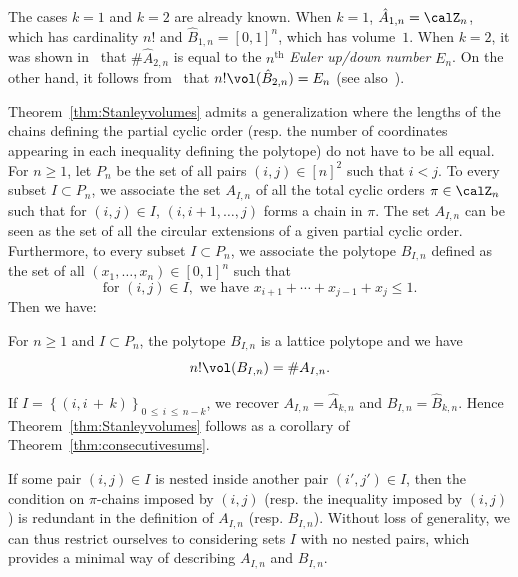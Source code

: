 \begin{rema}\label{rem:k23}
The cases $k=1$ and $k=2$ are already known. When $k=1$, $\hat{A}_{1,n}=\calZ_n$, which has cardinality $n!$ and $\hat{B}_{1,n}=[0,1]^n$, which has volume~$1$. When $k=2$, it was shown in~\cite{R17} that $\# \hat{A}_{2,n}$ is equal to the $n^\text{th}$ \emph{Euler up/down number} $E_n$. On the other hand, it follows from~\cite[Exercise~4.56$\MK$(c)]{S12} that $n! \vol(\hat{B}_{2,n}) = E_n$ (see also~\cite{SMN79}).
\end{rema}
Theorem~\ref{thm:Stanleyvolumes} admits a generalization where the lengths of the chains defining the partial cyclic order (resp. the number of coordinates appearing in each inequality defining the polytope) do not have to be all equal. For $n\geq1$, let $P_n$ be the set of all pairs $(i,j)\in [n]^2$ such that $i<j$. To every subset $I\subset P_n$, we associate the set $A_{I,n}$ of all the total cyclic orders $\pi \in\calZ_n$ such that for $(i,j)\in I$, $(i,i+1,\ldots,j)$ forms a chain in $\pi$. The set $A_{I,n}$ can be seen as the set of all the circular extensions of a given partial cyclic order. Furthermore, to every subset $I\subset P_n$, we associate the polytope $B_{I,n}$ defined as the set of all $(x_1,\ldots,x_{n})\in[0,1]^{n}$ such that
\[
\text{for } (i,j)\in I, \text{ we have } x_{i+1} + \cdots + x_{j-1} + x_j\leq 1.
\]
Then we have:

\begin{theo}\label{thm:consecutivesums}
For $n\geq1$ and $I\subset P_{n}$, the polytope $B_{I,n}$ is a lattice polytope and we have
\begin{equation}
n! \vol(B_{I,n}) = \# A_{I,n}.
\end{equation}
\end{theo}

If $I=\left\{(i,i\,+\,k)\right\}_{0\,\leq\,i\,\leq\,n-k}$, we recover $A_{I,n}=\hat{A}_{k,n}$ and $B_{I,n}=\hat{B}_{k,n}$. Hence Theorem~\ref{thm:Stanleyvolumes} follows as a corollary of Theorem~\ref{thm:consecutivesums}.

\begin{rema}
If some pair $(i,j)\in I$ is nested inside another pair $(i',j')\in I$, then the condition on $\pi$-chains imposed by $(i,j)$ (resp. the inequality imposed by $(i,j)$) is redundant in the definition of $A_{I,n}$ (resp. $B_{I,n}$). Without loss of generality, we can thus restrict ourselves to considering sets $I$ with no nested pairs, which provides a minimal way of describing $A_{I,n}$ and $B_{I,n}$.
\end{rema}

